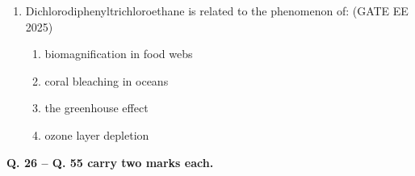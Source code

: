 \begin{enumerate}[leftmargin=*,label=\textbf{Q.\arabic*},resume]
\item Dichlorodiphenyltrichloroethane is related to the phenomenon of: \hfill {(GATE EE 2025)}
\begin{multicols}{2}
\begin{enumerate}
\item biomagnification in food webs
\item coral bleaching in oceans
\item the greenhouse effect
\item ozone layer depletion
\end{enumerate}
\end{multicols}

\end{enumerate}
\newpage
{}

\noindent \textbf{Q. 26 -- Q. 55 carry two marks each.}

